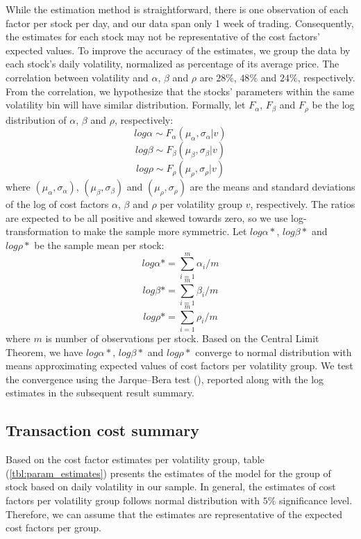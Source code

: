 \documentclass{article}
\begin{document}
While the estimation method is straightforward, there is one observation of each factor per stock per day, and our data span only 1 week of trading. Consequently, the estimates for each stock may not be representative of the cost factors' expected values. To improve the accuracy of the estimates, we group the data by each stock's daily volatility, normalized as percentage of its average price. The correlation between volatility and $\alpha$, $\beta$ and $\rho$ are $28\%$, $48\%$ and $24\%$, respectively. From the correlation, we hypothesize that the stocks' parameters within the same volatility bin will have similar distribution. Formally, let $F_\alpha$, $F_\beta$ and $F_\rho$ be the log distribution of $\alpha$, $\beta$ and $\rho$, respectively:
\[
  log \alpha \sim F_\alpha(\mu_\alpha,\sigma_\alpha|v)
\]
\[
  log \beta \sim F_\beta(\mu_\beta,\sigma_\beta|v)
\]
\[
  log \rho \sim F_\rho(\mu_\rho,\sigma_\rho|v)
\]
where $(\mu_\alpha,\sigma_\alpha)$, $(\mu_\beta,\sigma_\beta)$ and $(\mu_\rho,\sigma_\rho)$ are the means and standard deviations of the log of cost factors $\alpha$, $\beta$ and $\rho$ per volatility group $v$, respectively. The ratios are expected to be all positive and skewed towards zero, so we use log-transformation to make the sample more symmetric. Let $log \alpha*$, $log \beta*$ and $log \rho*$ be the sample mean per stock:
\[
  log \alpha* = \sum_{i=1}^m \alpha_i/m
\]
\[
  log \beta* = \sum_{i=1}^m \beta_i/m
\]
\[
  log \rho* = \sum_{i=1}^m \rho_i/m
\]
where $m$ is number of observations per stock. Based on the Central Limit Theorem, we have $log \alpha*$, $log \beta*$ and $log \rho*$ converge to normal distribution with means approximating expected values of cost factors per volatility group. We test the convergence using the Jarque–Bera test (\cite{JarqueBera1980}), reported along with the log estimates in the subsequent result summary.

\subsection{Transaction cost summary}

Based on the cost factor estimates per volatility group, table (\ref{tbl:param_estimates}) presents the estimates of the model for the group of stock based on daily volatility in our sample. In general, the estimates of cost factors per volatility group follows normal distribution with $5\%$ significance level. Therefore, we can assume that the estimates are representative of the expected cost factors per group.
\end{document}
